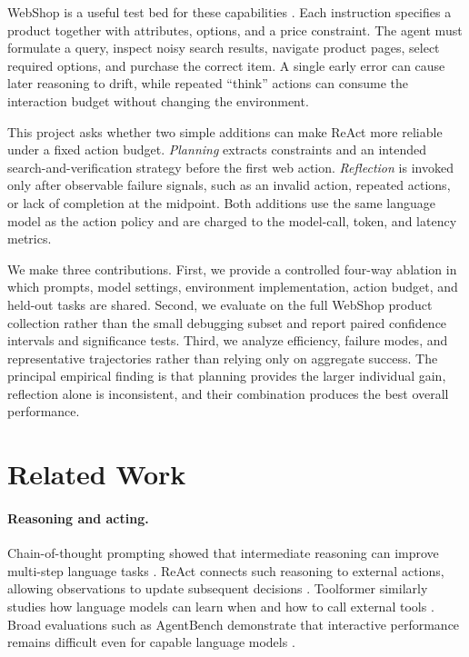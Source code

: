 \documentclass{article}
\begin{document}
WebShop is a useful test bed for these capabilities \citep{yao2022webshop}. Each instruction specifies a product together with attributes, options, and a price constraint. The agent must formulate a query, inspect noisy search results, navigate product pages, select required options, and purchase the correct item. A single early error can cause later reasoning to drift, while repeated ``think'' actions can consume the interaction budget without changing the environment.

This project asks whether two simple additions can make ReAct more reliable under a fixed action budget. \emph{Planning} extracts constraints and an intended search-and-verification strategy before the first web action. \emph{Reflection} is invoked only after observable failure signals, such as an invalid action, repeated actions, or lack of completion at the midpoint. Both additions use the same language model as the action policy and are charged to the model-call, token, and latency metrics.

We make three contributions. First, we provide a controlled four-way ablation in which prompts, model settings, environment implementation, action budget, and held-out tasks are shared. Second, we evaluate on the full WebShop product collection rather than the small debugging subset and report paired confidence intervals and significance tests. Third, we analyze efficiency, failure modes, and representative trajectories rather than relying only on aggregate success. The principal empirical finding is that planning provides the larger individual gain, reflection alone is inconsistent, and their combination produces the best overall performance.

\section{Related Work}

\paragraph{Reasoning and acting.}
Chain-of-thought prompting showed that intermediate reasoning can improve multi-step language tasks \citep{wei2022chain}. ReAct connects such reasoning to external actions, allowing observations to update subsequent decisions \citep{yao2023react}. Toolformer similarly studies how language models can learn when and how to call external tools \citep{schick2023toolformer}. Broad evaluations such as AgentBench demonstrate that interactive performance remains difficult even for capable language models \citep{liu2024agentbench}.
\end{document}

